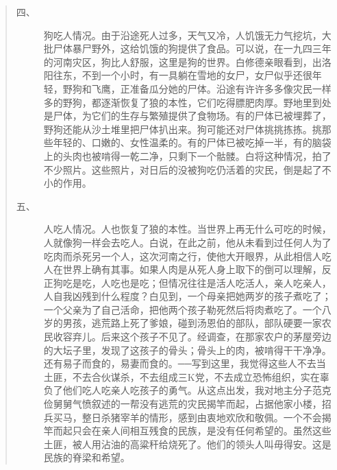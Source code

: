 \begin{quote}
\begin{description}
		\item [四、] 狗吃人情况。由于沿途死人过多，天气又冷，人饥饿无力气挖坑，大批尸体暴尸野外，这给饥饿的狗提供了食品。可以说，在一九四三年的河南灾区，狗比人舒服，这里是狗的世界。白修德亲眼看到，出洛阳往东，不到一个小时，有一具躺在雪地的女尸，女尸似乎还很年轻，野狗和飞鹰，正准备瓜分她的尸体。沿途有许许多多像灾民一样多的野狗，都逐渐恢复了狼的本性，它们吃得膘肥肉厚。野地里到处是尸体，为它们的生存与繁殖提供了食物场。有的尸体已被埋葬了，野狗还能从沙土堆里把尸体扒出来。狗可能还对尸体挑挑拣拣。挑那些年轻的、口嫩的、女性温柔的。有的尸体已被吃掉一半，有的脑袋上的头肉也被啃得一乾二净，只剩下一个骷髅。白将这种情况，拍了不少照片。这些照片，对日后的没被狗吃仍活着的灾民，倒是起了不小的作用。\\
		
		\item [五、] 人吃人情况。人也恢复了狼的本性。当世界上再无什么可吃的时候，人就像狗一样会去吃人。白说，在此之前，他从未看到过任何人为了吃肉而杀死另一个人，这次河南之行，使他大开眼界，从此相信人吃人在世界上确有其事。如果人肉是从死人身上取下的倒可以理解，反正狗吃是吃，人吃也是吃；但情况往往是活人吃活人，亲人吃亲人，人自我凶残到什么程度？白见到，一个母亲把她两岁的孩子煮吃了；一个父亲为了自己活命，把他两个孩子勒死然后将肉煮吃了。一个八岁的男孩，逃荒路上死了爹娘，碰到汤恩伯的部队，部队硬要一家农民收容弃儿。后来这个孩子不见了。经调查，在那家农户的茅屋旁边的大坛子里，发现了这孩子的骨头；骨头上的肉，被啃得干干净净。还有易子而食的，易妻而食的。{\Add ──}写到这里，我觉得这些人不去当土匪，不去合伙谋杀，不去组成三{\Add K}党，不去成立恐怖组织，实在辜负了他们吃人吃亲人吃孩子的勇气。从这点出发，我对地主分子范克俭舅舅气愤叙述的一帮没有逃荒的灾民揭竿而起，占据他家小楼，招兵买马，整日杀猪宰羊的情形，感到由衷地欢欣和敬佩。一个不会揭竿而起只会在亲人间相互残食的民族，是没有任何希望的。虽然这些土匪，被人用沾油的高粱秆给烧死了。他们的领头人叫毋得安。这是民族的脊梁和希望。\\
	\end{description}
\end{quote}
